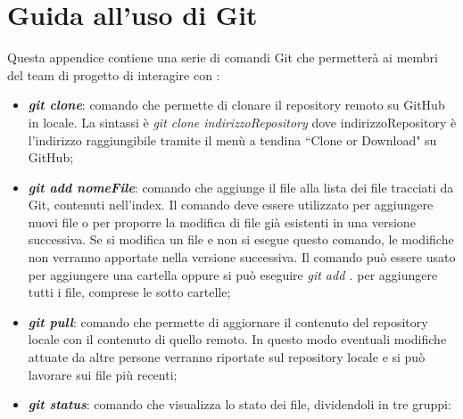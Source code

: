 \section{Guida all'uso di Git} \label{guidaGit}

                Questa appendice contiene una serie di comandi Git che permetterà ai membri del team di
                progetto di interagire con :

                    \begin{itemize}
                        \item \textbf{\textit{git clone}}: comando che permette di clonare il repository
                        remoto su GitHub in locale.
                        La sintassi è \textit{git clone indirizzoRepository} dove indirizzoRepository è
                        l'indirizzo raggiungibile tramite il menù a tendina ``Clone or Download" su GitHub;
                        \item \textbf{\textit{git add nomeFile}}: comando che aggiunge il file alla lista
                        dei file tracciati da Git, contenuti nell'index.
                        Il comando deve essere utilizzato per aggiungere nuovi file o per proporre la modifica
                        di file già esistenti in una versione successiva. Se si modifica un file e non si
                        esegue questo comando, le modifiche non verranno apportate nella versione successiva.
                        Il comando può essere usato per aggiungere una cartella oppure si può eseguire
                        \textit{git add .} per aggiungere tutti i file, comprese le sotto cartelle;
                        \item \textbf{\textit{git pull}}: comando che permette di aggiornare il contenuto
                        del repository locale con il contenuto di quello remoto. In questo modo eventuali
                        modifiche attuate da altre persone verranno riportate sul repository locale e si
                        può lavorare sui file più recenti;
                        \item \textbf{\textit{git status}}: comando che visualizza lo stato dei file,
                        dividendoli in tre gruppi:


\end{itemize}
